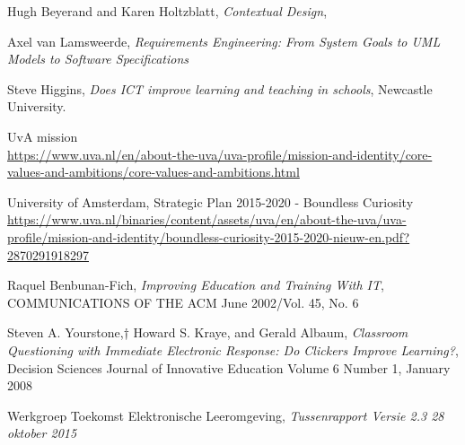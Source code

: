\begin{thebibliography}{9}
	
	Hugh Beyerand and Karen Holtzblatt,
	\emph{Contextual Design},
	
	Axel van Lamsweerde,
	\emph{Requirements Engineering: From System Goals to UML Models to Software Specifications}
	
	Steve Higgins,
	\emph{Does ICT improve learning and teaching in schools},
	Newcastle University.
	
	UvA mission \\
	\url{https://www.uva.nl/en/about-the-uva/uva-profile/mission-and-identity/core-values-and-ambitions/core-values-and-ambitions.html}
	
	University of Amsterdam,
	Strategic Plan 2015-2020 - Boundless Curiosity \\
	\url{https://www.uva.nl/binaries/content/assets/uva/en/about-the-uva/uva-profile/mission-and-identity/boundless-curiosity-2015-2020-nieuw-en.pdf?2870291918297}
	
	Raquel Benbunan-Fich,
	\emph{Improving Education and Training With IT},
	COMMUNICATIONS OF THE ACM June 2002/Vol. 45, No. 6
	
	Steven A. Yourstone,† Howard S. Kraye, and Gerald Albaum,
	\emph{Classroom Questioning with Immediate Electronic Response: Do Clickers Improve Learning?},
	Decision Sciences Journal of Innovative Education Volume 6 Number 1,
	January 2008
	
	Werkgroep Toekomst Elektronische Leeromgeving,
	\emph{Tussenrapport Versie 2.3 28 oktober 2015}
	

	
\end{thebibliography}


\appendix



